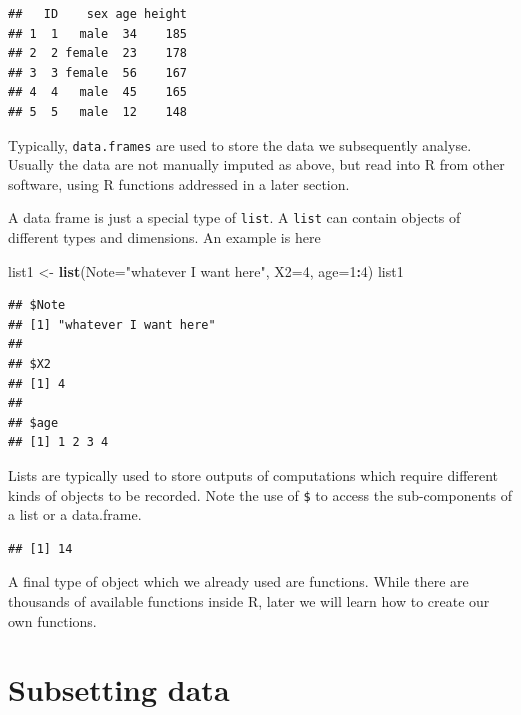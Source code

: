 \documentclass[]{book}
\newenvironment{Shaded}{\begin{snugshade}}{\end{snugshade}}
\newcommand{\KeywordTok}[1]{\textcolor[rgb]{0.13,0.29,0.53}{\textbf{#1}}}
\newcommand{\DataTypeTok}[1]{\textcolor[rgb]{0.13,0.29,0.53}{#1}}
\newcommand{\DecValTok}[1]{\textcolor[rgb]{0.00,0.00,0.81}{#1}}
\newcommand{\StringTok}[1]{\textcolor[rgb]{0.31,0.60,0.02}{#1}}
\newcommand{\OperatorTok}[1]{\textcolor[rgb]{0.81,0.36,0.00}{\textbf{#1}}}
\newcommand{\NormalTok}[1]{#1}
\theoremstyle{definition}
\theoremstyle{definition}
\theoremstyle{remark}
\begin{document}
\begin{verbatim}
##   ID    sex age height
## 1  1   male  34    185
## 2  2 female  23    178
## 3  3 female  56    167
## 4  4   male  45    165
## 5  5   male  12    148
\end{verbatim}

Typically, \texttt{data.frames} are used to store the data we
subsequently analyse. Usually the data are not manually imputed as
above, but read into R from other software, using R functions addressed
in a later section.

A data frame is just a special type of \texttt{list}. A \texttt{list}
can contain objects of different types and dimensions. An example is
here

\begin{Shaded}
\begin{Highlighting}[]
\NormalTok{list1 <-}\StringTok{ }\KeywordTok{list}\NormalTok{(}\DataTypeTok{Note=}\StringTok{"whatever I want here"}\NormalTok{, }\DataTypeTok{X2=}\DecValTok{4}\NormalTok{, }\DataTypeTok{age=}\DecValTok{1}\OperatorTok{:}\DecValTok{4}\NormalTok{)}
\NormalTok{list1}
\end{Highlighting}
\end{Shaded}

\begin{verbatim}
## $Note
## [1] "whatever I want here"
## 
## $X2
## [1] 4
## 
## $age
## [1] 1 2 3 4
\end{verbatim}

Lists are typically used to store outputs of computations which require
different kinds of objects to be recorded. Note the use of \texttt{\$}
to access the sub-components of a list or a data.frame.

\begin{Shaded}
\end{Shaded}

\begin{verbatim}
## [1] 14
\end{verbatim}

A final type of object which we already used are functions. While there
are thousands of available functions inside R, later we will learn how
to create our own functions.

\section{Subsetting data}\label{subsetting-data}
\end{document}
